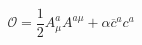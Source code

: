 \begin{equation}
\mathcal{O}=\frac{1}{2}A_{\mu }^{a}A^{a\mu }+\alpha \overline{c}^{a}c^{a}
\label{op}
\end{equation}

